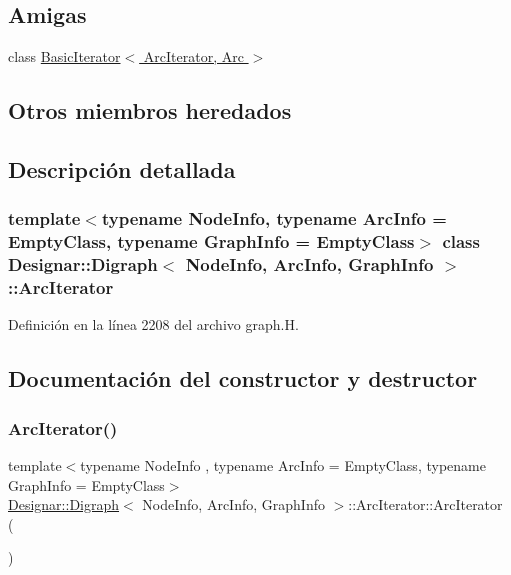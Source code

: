 \subsection*{Amigas}
\begin{DoxyCompactItemize}
\item 
class \hyperlink{class_designar_1_1_digraph_1_1_arc_iterator_a530ad7c7218fa9b74a5cce004d0e3a1c}{Basic\+Iterator$<$ Arc\+Iterator, Arc $>$}
\end{DoxyCompactItemize}
\subsection*{Otros miembros heredados}


\subsection{Descripción detallada}
\subsubsection*{template$<$typename Node\+Info, typename Arc\+Info = Empty\+Class, typename Graph\+Info = Empty\+Class$>$\newline
class Designar\+::\+Digraph$<$ Node\+Info, Arc\+Info, Graph\+Info $>$\+::\+Arc\+Iterator}



Definición en la línea 2208 del archivo graph.\+H.



\subsection{Documentación del constructor y destructor}
\mbox{\label{class_designar_1_1_digraph_1_1_arc_iterator_a0f540c556301e1d4e0a9d48433257b89}} 
\subsubsection{\texorpdfstring{Arc\+Iterator()}{ArcIterator()}\hspace{0.1cm}{\footnotesize\ttfamily [1/5]}}
{\footnotesize\ttfamily template$<$typename Node\+Info , typename Arc\+Info  = Empty\+Class, typename Graph\+Info  = Empty\+Class$>$ \\
\hyperlink{class_designar_1_1_digraph}{Designar\+::\+Digraph}$<$ Node\+Info, Arc\+Info, Graph\+Info $>$\+::Arc\+Iterator\+::\+Arc\+Iterator (\begin{DoxyParamCaption}{ }\end{DoxyParamCaption})\hspace{0.3cm}{\ttfamily [inline]}}



